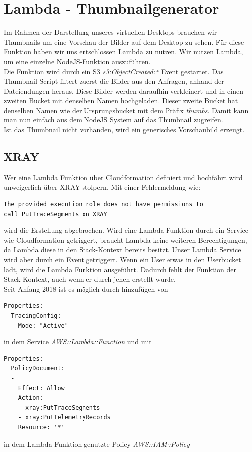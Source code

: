 \documentclass[a4paper, 12pt]{scrreprt}
\renewcommand\_{\textunderscore\allowbreak}
\begin{document}

\section{Lambda - Thumbnailgenerator}
Im Rahmen der Darstellung unseres virtuellen Desktops brauchen wir Thumbnails um eine Vorschau der Bilder auf dem Desktop zu sehen. Für diese Funktion haben wir  uns entschlossen Lambda zu nutzen. Wir nutzen Lambda, um eine einzelne NodeJS-Funktion auszuführen. \\
Die Funktion wird durch ein S3 \textit{s3:ObjectCreated:*} Event gestartet. Das Thumbnail Script filtert zuerst die Bilder aus den Anfragen, anhand der Dateiendungen heraus. Diese Bilder werden daraufhin verkleinert und in einen zweiten Bucket mit denselben Namen hochgeladen. Dieser zweite Bucket hat denselben Namen wie der Ursprungsbucket mit dem Präfix \textit{thumbs}. Damit kann man nun einfach aus dem NodeJS System auf das Thumbnail zugreifen. \\
Ist das Thumbnail nicht vorhanden, wird ein generisches Vorschaubild erzeugt. 
\subsection{XRAY}
Wer eine Lambda Funktion über Cloudformation definiert und hochfährt wird unweigerlich über XRAY stolpern. Mit einer Fehlermeldung wie: 
\begin{lstlisting}
The provided execution role does not have permissions to
call PutTraceSegments on XRAY
\end{lstlisting}
wird die Erstellung abgebrochen. Wird eine Lambda Funktion durch ein Service wie Cloudformation getriggert, braucht Lambda keine weiteren Berechtigungen, da Lambda diese in den Stack-Kontext bereits besitzt. Unser Lambda Service wird aber durch ein Event getriggert. Wenn ein User etwas in den Userbucket lädt, wird die Lambda Funktion ausgeführt. Dadurch fehlt der Funktion der Stack Kontext, auch wenn er durch jenen erstellt wurde. \\
Seit Anfang 2018 \cite{AWSDe} ist es möglich durch hinzufügen von
\begin{lstlisting}
Properties:
  TracingConfig:
    Mode: "Active"
\end{lstlisting} 
in dem Service \textit{AWS::Lambda::Function} und mit 
\begin{lstlisting}
Properties:
  PolicyDocument:
  -
    Effect: Allow
    Action:
    - xray:PutTraceSegments
    - xray:PutTelemetryRecords
    Resource: '*'
\end{lstlisting} 
in dem Lambda Funktion genutzte Policy \textit{AWS::IAM::Policy}
\end{document}
